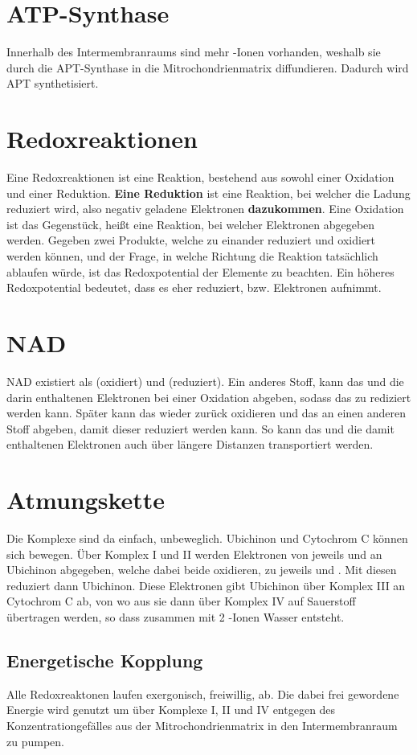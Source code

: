 \documentclass{article}
\begin{document}
\section{ATP-Synthase}
Innerhalb des Intermembranraums sind mehr -Ionen vorhanden, weshalb sie durch die APT-Synthase in die Mitrochondrienmatrix diffundieren. Dadurch wird APT synthetisiert.  
 
\section{Redoxreaktionen}
Eine Redoxreaktionen ist eine Reaktion, bestehend aus sowohl einer Oxidation und einer Reduktion. \textbf{Eine Reduktion} ist eine Reaktion, bei welcher die Ladung reduziert wird, also negativ geladene Elektronen \textbf{dazukommen}. Eine Oxidation ist das Gegenstück, heißt eine Reaktion, bei welcher Elektronen abgegeben werden. \newline
Gegeben zwei Produkte, welche zu einander reduziert und oxidiert werden können, und der Frage, in welche Richtung die Reaktion tatsächlich ablaufen würde, ist das Redoxpotential der Elemente zu beachten. Ein höheres Redoxpotential bedeutet, dass es eher reduziert, bzw. Elektronen aufnimmt. 
 
\section{NAD}
NAD existiert als  (oxidiert) und  (reduziert).
Ein anderes Stoff,  kann das  und die darin enthaltenen Elektronen bei einer Oxidation abgeben, sodass das  zu  rediziert werden kann. Später kann das  wieder zurück oxidieren und das  an einen anderen Stoff abgeben, damit dieser reduziert werden kann. So kann das  und die damit enthaltenen Elektronen auch über längere Distanzen transportiert werden.
 
\section{Atmungskette} 
Die Komplexe sind da einfach, unbeweglich. Ubichinon und Cytochrom C können sich bewegen. 
Über Komplex I und II werden Elektronen von jeweils  und  an Ubichinon abgegeben, welche dabei beide oxidieren, zu jeweils  und . Mit diesen reduziert dann Ubichinon. Diese Elektronen gibt Ubichinon über Komplex III an Cytochrom C ab, von wo aus sie dann über Komplex IV auf Sauerstoff übertragen werden, so dass zusammen mit 2 -Ionen Wasser entsteht.
\subsection{Energetische Kopplung}
Alle Redoxreaktonen laufen exergonisch, freiwillig, ab. Die dabei frei gewordene Energie wird genutzt um  über Komplexe I, II und IV entgegen des Konzentrationgefälles aus der Mitrochondrienmatrix in den Intermembranraum zu pumpen. 
 
\end{document}
